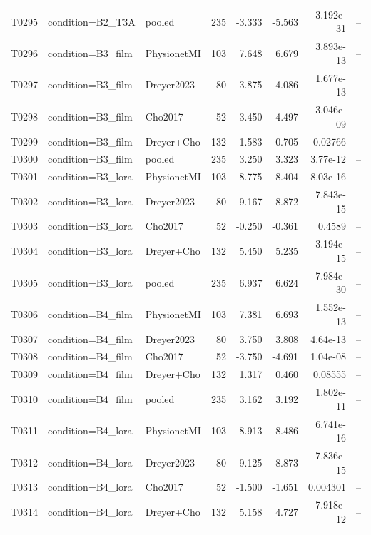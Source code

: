 \begin{longtable}{p{.45in}p{2.6in}p{.75in}rrrrr}
T0295 & condition=B2\_\allowbreak{}T3A & pooled & 235 & -3.333 & -5.563 & 3.192e-31 & -- \\
T0296 & condition=B3\_\allowbreak{}film & PhysionetMI & 103 & 7.648 & 6.679 & 3.893e-13 & -- \\
T0297 & condition=B3\_\allowbreak{}film & Dreyer2023 & 80 & 3.875 & 4.086 & 1.677e-13 & -- \\
T0298 & condition=B3\_\allowbreak{}film & Cho2017 & 52 & -3.450 & -4.497 & 3.046e-09 & -- \\
T0299 & condition=B3\_\allowbreak{}film & Dreyer+Cho & 132 & 1.583 & 0.705 & 0.02766 & -- \\
T0300 & condition=B3\_\allowbreak{}film & pooled & 235 & 3.250 & 3.323 & 3.77e-12 & -- \\
T0301 & condition=B3\_\allowbreak{}lora & PhysionetMI & 103 & 8.775 & 8.404 & 8.03e-16 & -- \\
T0302 & condition=B3\_\allowbreak{}lora & Dreyer2023 & 80 & 9.167 & 8.872 & 7.843e-15 & -- \\
T0303 & condition=B3\_\allowbreak{}lora & Cho2017 & 52 & -0.250 & -0.361 & 0.4589 & -- \\
T0304 & condition=B3\_\allowbreak{}lora & Dreyer+Cho & 132 & 5.450 & 5.235 & 3.194e-15 & -- \\
T0305 & condition=B3\_\allowbreak{}lora & pooled & 235 & 6.937 & 6.624 & 7.984e-30 & -- \\
T0306 & condition=B4\_\allowbreak{}film & PhysionetMI & 103 & 7.381 & 6.693 & 1.552e-13 & -- \\
T0307 & condition=B4\_\allowbreak{}film & Dreyer2023 & 80 & 3.750 & 3.808 & 4.64e-13 & -- \\
T0308 & condition=B4\_\allowbreak{}film & Cho2017 & 52 & -3.750 & -4.691 & 1.04e-08 & -- \\
T0309 & condition=B4\_\allowbreak{}film & Dreyer+Cho & 132 & 1.317 & 0.460 & 0.08555 & -- \\
T0310 & condition=B4\_\allowbreak{}film & pooled & 235 & 3.162 & 3.192 & 1.802e-11 & -- \\
T0311 & condition=B4\_\allowbreak{}lora & PhysionetMI & 103 & 8.913 & 8.486 & 6.741e-16 & -- \\
T0312 & condition=B4\_\allowbreak{}lora & Dreyer2023 & 80 & 9.125 & 8.873 & 7.836e-15 & -- \\
T0313 & condition=B4\_\allowbreak{}lora & Cho2017 & 52 & -1.500 & -1.651 & 0.004301 & -- \\
T0314 & condition=B4\_\allowbreak{}lora & Dreyer+Cho & 132 & 5.158 & 4.727 & 7.918e-12 & -- \\

\end{longtable}

